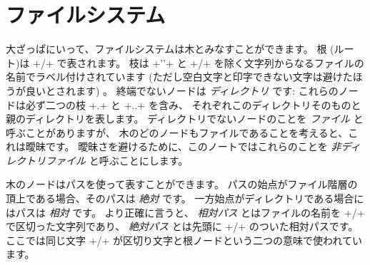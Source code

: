 \section{ファイルシステム}

大ざっぱにいって、ファイルシステムは木とみなすことができます。
根 (ルート)は \ml+/+ で表されます。
枝は \ml+''+ と \ml+/+ を除く文字列からなるファイルの名前でラベル付けされています
(ただし空白文字と印字できない文字は避けたほうが良いとされます) 。
終端でないノードは \emph{ディレクトリ} です: これらのノードは必ず二つの枝 \ml+.+ と \ml+..+ を含み、
それぞれこのディレクトリそのものと親のディレクトリを表します。
ディレクトリでないノードのことを \emph{ファイル} と呼ぶことがありますが、
木のどのノードもファイルであることを考えると、これは曖昧です。
曖昧さを避けるために、このノートではこれらのことを \emph{非ディレクトリファイル} と呼ぶことにします。

木のノードはパスを使って表すことができます。
パスの始点がファイル階層の頂上である場合、そのパスは \emph{絶対} です。
一方始点がディレクトリである場合にはパスは \emph{相対} です。
より正確に言うと、 \emph{相対パス} とはファイルの名前を \ml+/+ で区切った文字列であり、
\emph{絶対パス} とは先頭に \ml+/+ のついた相対パスです。
ここでは同じ文字 \ml+/+ が区切り文字と根ノードという二つの意味で使われています。

